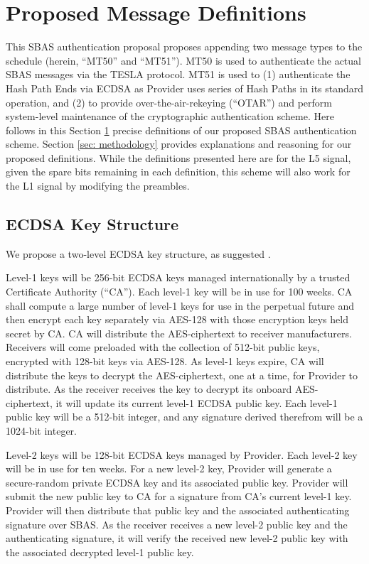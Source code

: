 \documentclass[letterpaper,times]{IONconf/IONconf}
\begin{document}
\section{Proposed Message Definitions} \label{sec: definitions}

This SBAS authentication proposal proposes appending two message types to the schedule (herein, ``MT50'' and ``MT51'').
MT50 is used to authenticate the actual SBAS messages via the TESLA protocol.
MT51 is used to (1) authenticate the Hash Path Ends via ECDSA as Provider uses series of Hash Paths in its standard operation, and (2) to provide over-the-air-rekeying (``OTAR'') and perform system-level maintenance of the cryptographic authentication scheme.
Here follows in this Section \ref{sec: definitions} precise definitions of our proposed SBAS authentication scheme.
Section \ref{sec: methodology} provides explanations and reasoning for our proposed definitions.
While the definitions presented here are for the L5 signal, given the spare bits remaining in each definition, this scheme will also work for the L1 signal by modifying the preambles.

\subsection{ECDSA Key Structure} \label{sec: ECDSA Key Structure}

We propose a two-level ECDSA key structure, as suggested \cite{Neish_Dissertation}.

Level-1 keys will be 256-bit ECDSA keys managed internationally by a trusted Certificate Authority (``CA'').
Each level-1 key will be in use for 100 weeks.
CA shall compute a large number of level-1 keys for use in the perpetual future and then encrypt each key separately via AES-128 with those encryption keys held secret by CA.
CA will distribute the AES-ciphertext to receiver manufacturers.
Receivers will come preloaded with the collection of 512-bit public keys, encrypted with 128-bit keys via AES-128.
As level-1 keys expire, CA will distribute the keys to decrypt the AES-ciphertext, one at a time, for Provider to distribute.
As the receiver receives the key to decrypt its onboard AES-ciphertext, it will update its current level-1 ECDSA public key.
Each level-1 public key will be a 512-bit integer, and any signature derived therefrom will be a 1024-bit integer.

Level-2 keys will be 128-bit ECDSA keys managed by Provider.
Each level-2 key will be in use for ten weeks.
For a new level-2 key, Provider will generate a secure-random private ECDSA key and its associated public key.
Provider will submit the new public key to CA for a signature from CA's current level-1 key.
Provider will then distribute that public key and the associated authenticating signature over SBAS.
As the receiver receives a new level-2 public key and the authenticating signature, it will verify the received new level-2 public key with the associated decrypted level-1 public key.
\end{document}
